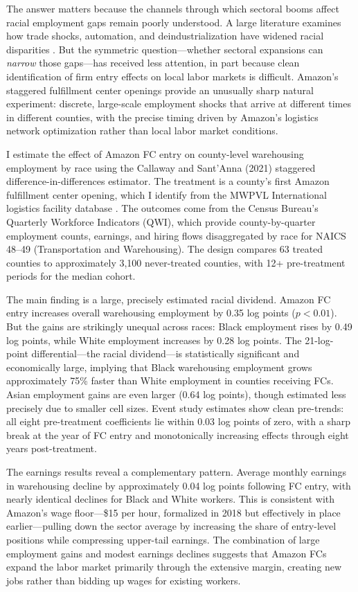 \documentclass[12pt]{article}
\begin{document}
The answer matters because the channels through which sectoral booms affect racial employment gaps remain poorly understood. A large literature examines how trade shocks, automation, and deindustrialization have widened racial disparities \citep{AutorDornHanson2013, Charles2018, Derenoncourt2022}. But the symmetric question---whether sectoral expansions can \textit{narrow} those gaps---has received less attention, in part because clean identification of firm entry effects on local labor markets is difficult. Amazon's staggered fulfillment center openings provide an unusually sharp natural experiment: discrete, large-scale employment shocks that arrive at different times in different counties, with the precise timing driven by Amazon's logistics network optimization rather than local labor market conditions.

I estimate the effect of Amazon FC entry on county-level warehousing employment by race using the Callaway and Sant'Anna (2021) staggered difference-in-differences estimator. The treatment is a county's first Amazon fulfillment center opening, which I identify from the MWPVL International logistics facility database \citep{MWPVL2016}. The outcomes come from the Census Bureau's Quarterly Workforce Indicators (QWI), which provide county-by-quarter employment counts, earnings, and hiring flows disaggregated by race for NAICS 48--49 (Transportation and Warehousing). The design compares 63 treated counties to approximately 3,100 never-treated counties, with 12+ pre-treatment periods for the median cohort.

The main finding is a large, precisely estimated racial dividend. Amazon FC entry increases overall warehousing employment by 0.35 log points ($p < 0.01$). But the gains are strikingly unequal across races: Black employment rises by 0.49 log points, while White employment increases by 0.28 log points. The 21-log-point differential---the racial dividend---is statistically significant and economically large, implying that Black warehousing employment grows approximately 75\% faster than White employment in counties receiving FCs. Asian employment gains are even larger (0.64 log points), though estimated less precisely due to smaller cell sizes. Event study estimates show clean pre-trends: all eight pre-treatment coefficients lie within 0.03 log points of zero, with a sharp break at the year of FC entry and monotonically increasing effects through eight years post-treatment.

The earnings results reveal a complementary pattern. Average monthly earnings in warehousing decline by approximately 0.04 log points following FC entry, with nearly identical declines for Black and White workers. This is consistent with Amazon's wage floor---\$15 per hour, formalized in 2018 but effectively in place earlier---pulling down the sector average by increasing the share of entry-level positions while compressing upper-tail earnings. The combination of large employment gains and modest earnings declines suggests that Amazon FCs expand the labor market primarily through the extensive margin, creating new jobs rather than bidding up wages for existing workers.
\end{document}

